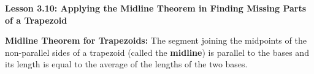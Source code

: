 \begin{center}
\textbf{Lesson 3.10: Applying the Midline Theorem in Finding Missing Parts of a Trapezoid}
\end{center}

\vspace*{-1.5ex}

\noindent\textbf{Midline Theorem for Trapezoids:} The segment joining the midpoints of the non-parallel sides of a trapezoid (called the \textbf{midline}) is parallel to the bases and its length is equal to the average of the lengths of the two bases.


